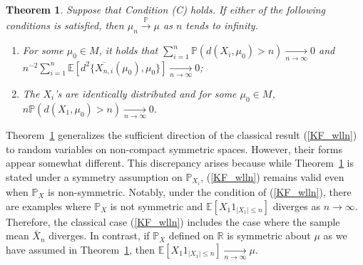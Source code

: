 \documentclass[preprint]{imsart}
\theoremstyle{plain}
\newtheorem{theorem}{Theorem}
\theoremstyle{remark}
\begin{document}
\begin{theorem}\label{thm:main}  
Suppose that Condition (C) holds. If either of the following conditions is satisfied, then $\mu_{n} \overset{\mathbb{P}}{\to} \mu$ as $n$ tends to infinity.
\begin{enumerate}
  \item[(i)] For some $\mu_0 \in M$, it holds that $\sum_{i=1}^{n} \mathbb{P}(d(X_i, \mu_0) > n) \underset{n \to \infty}{\to} 0$ and $n^{-2}\sum_{i=1}^{n}\mathbb{E}[d^2\{\overline{X_{n,i}}(\mu_0), \mu_0\}] \underset{n \to \infty}{\to} 0$;

  \item[(ii)] The $X_i$'s are identically distributed and for some $\mu_0 \in M$, $n\mathbb{P}(d(X_1, \mu_0) > n) \underset{n \to \infty}{\to} 0$.
\end{enumerate}

\end{theorem}





Theorem~\ref{thm:main}  generalizes the sufficient direction of the classical result  (\ref{KF_wlln}) to random variables on non-compact symmetric spaces. 
However, their forms appear somewhat different. This discrepancy arises because while Theorem~\ref{thm:main} is stated under a symmetry assumption on $\mathbb{P}_{X_i}$, (\ref{KF_wlln}) remains valid even when $\mathbb{P}_{X}$ is non-symmetric. Notably, under the condition of (\ref{KF_wlln}), there are examples where $\mathbb{P}_{X}$ is not symmetric and $\mathbb{E}[X_1 1_{|X_1|\le n}]$ diverges as $n\to \infty$. Therefore, the classical case (\ref{KF_wlln}) includes the case where the sample mean $\bar{X}_n$ diverges. %
In contrast, if $\mathbb{P}_{X}$ defined on $\mathbb{R}$ is symmetric about $\mu$ as we have assumed in Theorem~\ref{thm:main}, then $\mathbb{E}[X_1 1_{|X_1|\le n}] \underset{n\to \infty}{\to} \mu$. 
\end{document}
